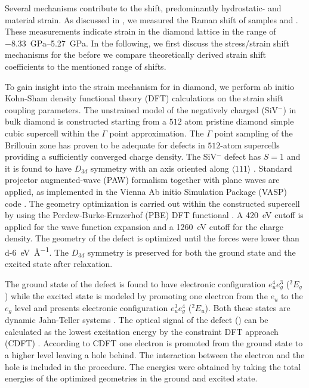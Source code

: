 	Several mechanisms contribute to the \cwl shift, predominantly hydrostatic- and material strain.
	As discussed in , we measured the Raman shift of samples \insituS and \implantedTao.
	These measurements indicate strain in the diamond lattice in the range of \SIrange{-8.33}{5.27}{\giga\pascal}.
	In the following, we first discuss the stress/strain shift mechanisms for the \siv before we compare theoretically derived strain shift coefficients to the mentioned range of \ZPL shifts.

	To gain insight into the strain mechanism for \sivs in diamond, we perform ab initio Kohn-Sham density functional theory (DFT) calculations on the strain \ZPL shift coupling parameters. 
	The unstrained model of the negatively charged \sivc (SiV$^{-}$) in bulk diamond is constructed starting from a $512$ atom pristine diamond simple cubic supercell within the $\Gamma$ point approximation. 
	The $\Gamma$ point sampling of the Brillouin zone has proven to be adequate for defects in $512$-atom supercells \cite{deak2014formation,kaviani2014proper} providing a sufficiently converged charge density. 
	The SiV$^{-}$ defect has $S=1$ and it is found to have $D_{3d}$ symmetry with an axis oriented along  $\langle 111 \rangle$ \cite{Goss2007}. 
	Standard projector augmented-wave (PAW) formalism together with plane waves are applied, as implemented in the Vienna Ab initio Simulation Package (VASP) code \cite{kresse1993ab,kresse1996efficiency,kresse1996efficient,kresse1999ultrasoft}. The geometry optimization is carried out within the constructed supercell by using the Perdew-Burke-Ernzerhof (PBE) DFT functional \cite{perdew1996generalized}. A \SI{420}{\eV} cutoff is applied for the wave function expansion and a \SI{1260}{\eV} cutoff for the charge density. The geometry of the defect is optimized until the forces were lower than \SI{d-6}{\eV\per\angstrom}. The $D_{3d}$ symmetry is preserved for both the ground state and the excited state after relaxation.

	The ground state of the defect is found to have electronic configuration $e^{4}_{u} e^{3}_{g}$ (${}^{2}E_{g}$) while the excited state is modeled by promoting one electron from the $e_u$ to the $e_g$ level and presents electronic configuration  $e^{3}_{u} e^{4}_{g}$ (${}^{2}E_{u}$). Both these states are dynamic Jahn-Teller systems \cite{Hepp2014, Rogers2014a}. The optical signal of the defect (\ZPL) can be calculated as the lowest excitation energy by the constraint DFT approach (CDFT) \cite{gali2009theory}. According to CDFT one electron is promoted from the ground state to a higher level leaving a hole behind. The interaction between the electron and the hole is included in the procedure. The \ZPL energies were obtained by taking the total energies of the optimized geometries in the ground and excited state.

